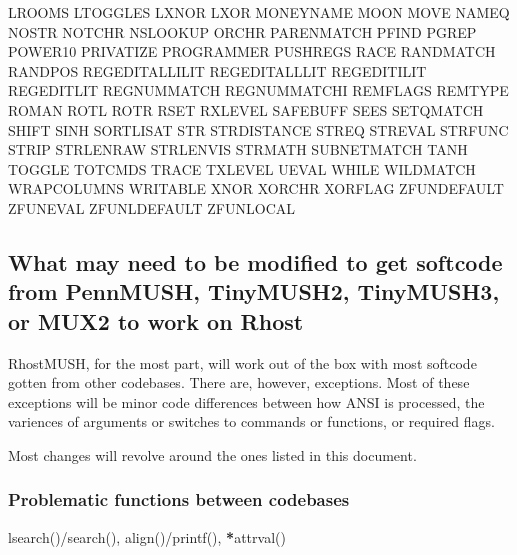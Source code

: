 \documentclass[letterpaper,10pt,english]{sphinxmanual}
\begin{document}
LROOMS                       LTOGGLES                      LXNOR
LXOR                         MONEYNAME                     MOON
MOVE                         NAMEQ                         NOSTR
NOTCHR                       NSLOOKUP                      ORCHR
PARENMATCH                   PFIND                         PGREP
POWER10                      PRIVATIZE                     PROGRAMMER
PUSHREGS                     RACE                          RANDMATCH
RANDPOS                      REGEDITALLILIT                REGEDITALLLIT
REGEDITILIT                  REGEDITLIT                    REGNUMMATCH
REGNUMMATCHI                 REMFLAGS                      REMTYPE
ROMAN                        ROTL                          ROTR
RSET                         RXLEVEL                       SAFEBUFF
SEES                         SETQMATCH                     SHIFT
SINH                         SORTLISAT                     STR
STRDISTANCE                  STREQ                         STREVAL
STRFUNC                      STRIP                         STRLENRAW
STRLENVIS                    STRMATH                       SUBNETMATCH
TANH                         TOGGLE                        TOTCMDS
TRACE                        TXLEVEL                       UEVAL
WHILE                        WILDMATCH                     WRAPCOLUMNS
WRITABLE                     XNOR                          XORCHR
XORFLAG                      ZFUNDEFAULT                   ZFUNEVAL
ZFUNLDEFAULT                 ZFUNLOCAL


\subsection{What may need to be modified to get softcode from PennMUSH, TinyMUSH2, TinyMUSH3, or MUX2 to work on Rhost}
\label{\detokenize{differences:what-may-need-to-be-modified-to-get-softcode-from-pennmush-tinymush2-tinymush3-or-mux2-to-work-on-rhost}}
\sphinxAtStartPar
RhostMUSH, for the most part, will work out of the box with most softcode gotten
from other codebases.  There are, however, exceptions.  Most of these exceptions
will be minor code differences between how ANSI is processed, the variences
of arguments or switches to commands or functions, or required flags.

\sphinxAtStartPar
Most changes will revolve around the ones listed in this document.


\subsubsection{Problematic functions between codebases}
\label{\detokenize{differences:problematic-functions-between-codebases}}
\sphinxAtStartPar
lsearch()/search(), align()/printf(), {\color{red}\bfseries{}*}attrval()
\end{document}
